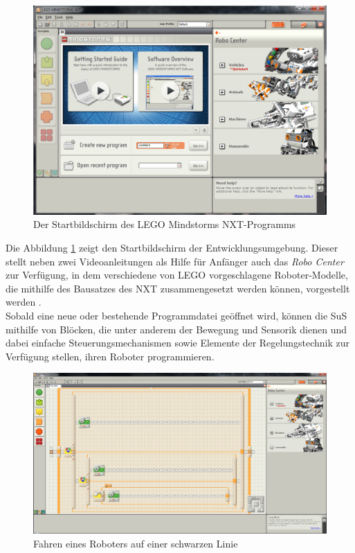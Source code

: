 \documentclass[paper=a4, pagesize, DIV=calc, BCOR=12.5mm, twoside=on, onecolumn=on, open = any, titlepage =on, parskip =half-, headsepline = on, footsepline = on, chapterprefix = on, appendixprefix = off, fontsize = 12pt, numbers = noenddot, abstract = on]{scrbook}
\numberwithin{equation}{chapter}
\theoremstyle{definition}
\theoremstyle{plain}
\theoremstyle{plain}
\theoremstyle{remark}
\theoremstyle{plain}
\theoremstyle{plain}
\begin{document}
\begin{figure}[htbp]
\includegraphics[scale=0.54]{images/Startbildschirm_NXT.png} 
\caption{Der Startbildschirm des LEGO Mindstorms NXT-Programms}
\label{fig:NXT Start}
\end{figure}

Die Abbildung \ref{fig:NXT Start} zeigt den Startbildschirm der Entwicklungsumgebung. Dieser stellt neben zwei Videoanleitungen als Hilfe für Anfänger auch das \emph{Robo Center} zur Verfügung, in dem verschiedene von LEGO vorgeschlagene Roboter-Modelle, die mithilfe des Bausatzes des NXT zusammengesetzt werden können, vorgestellt werden .\\
Sobald eine neue oder bestehende Programmdatei geöffnet wird, können die SuS mithilfe von Blöcken, die unter anderem der Bewegung und Sensorik dienen und dabei einfache Steuerungsmechanismen sowie Elemente der Regelungstechnik zur Verfügung stellen, ihren Roboter programmieren.

\begin{figure}[htbp]
\includegraphics[scale=0.281]{images/Beispielprogramm_NXT.png} 
\caption{Fahren eines Roboters auf einer schwarzen Linie}
\label{fig:Bsp NXT}
\end{figure}
\end{document}
